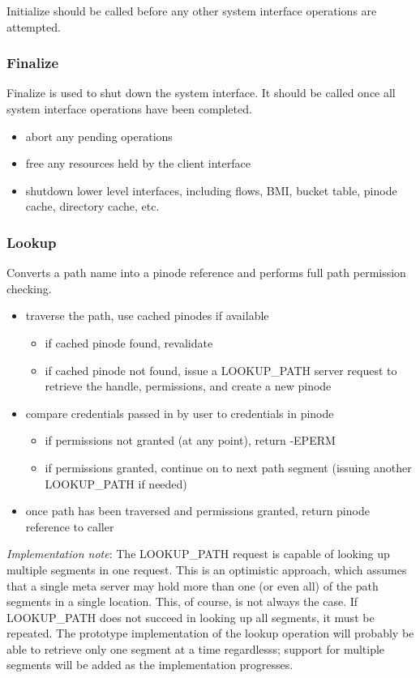 \documentclass[11pt, letterpaper]{article}
\begin{document}
Initialize should be called before any other system interface operations
are attempted. 
\subsubsection{Finalize}
Finalize is used to shut down the system interface.  It should be
called once all system interface operations have been completed.

\begin{itemize}
\item abort any pending operations
\item free any resources held by the client interface
\item shutdown lower level interfaces, including flows,
BMI, bucket table, pinode cache, directory cache, etc.
\end{itemize}

\subsubsection{Lookup}

Converts a path name into a pinode reference and performs full path
permission checking.

\begin{itemize}
\item traverse the path, use cached pinodes if available
\begin{itemize}
\item if cached pinode found, revalidate 
\item if cached pinode not found, issue a LOOKUP\_PATH server request
to retrieve the handle, permissions, and create a new pinode
\end{itemize}
\item compare credentials passed in by user to credentials in pinode
\begin{itemize}
\item if permissions not granted (at any point), return -EPERM
\item if permissions granted, continue on to next path segment
(issuing another LOOKUP\_PATH if needed)
\end{itemize}
\item once path has been traversed and permissions granted, return
pinode reference to caller
\end{itemize}

\emph{Implementation note}:  The LOOKUP\_PATH request is capable
of looking up multiple segments in one request.  This is an
optimistic approach, which assumes that a single meta server may
hold more than one (or even all) of the path segments in a single
location.  This, of course, is not always the case.  If LOOKUP\_PATH
does not succeed in looking up all segments, it must be repeated.
The prototype implementation of the lookup operation will probably be
able to retrieve only one segment at a time regardlesss; support for
multiple segments will be added as the implementation progresses.
\end{document}
